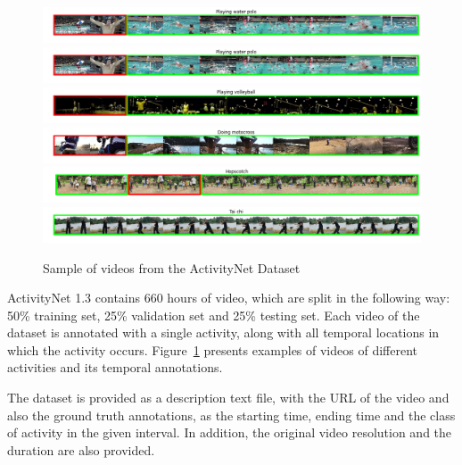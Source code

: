 \begin{figure}[t]
\begin{center}
\includegraphics[width=1\linewidth]{img/methodology/activitynet_examples/activitynet_example_1}
\includegraphics[width=1\linewidth]{img/methodology/activitynet_examples/activitynet_example_2}
\includegraphics[width=1\linewidth]{img/methodology/activitynet_examples/activitynet_example_3}
\includegraphics[width=1\linewidth]{img/methodology/activitynet_examples/activitynet_example_4}
\includegraphics[width=1\linewidth]{img/methodology/activitynet_examples/activitynet_example_5}
\includegraphics[width=1\linewidth]{img/methodology/activitynet_examples/activitynet_example_6}
\end{center}
\caption{Sample of videos from the ActivityNet Dataset}
\label{fig:dataset_example}
\end{figure}

ActivityNet 1.3 contains 660 hours of video, which are split in the following way: 50\% training set, 25\% validation set and 25\% testing set. Each video of the dataset is annotated with a single activity, along with all temporal locations in which the activity occurs. Figure~\ref{fig:dataset_example} presents examples of videos of different activities and its temporal annotations.

The dataset is provided as a description text file, with the URL of the video and also the ground truth annotations, as the starting time, ending time and the class of activity in the  given interval. In addition, the original video resolution and the duration are also provided.

